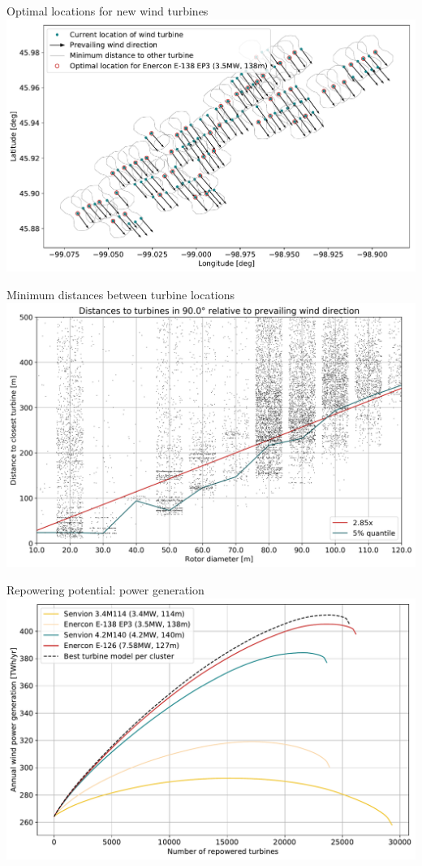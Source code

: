 \documentclass[color=usenames,dvipsnames]{beamer}
\begin{document}
    \begin{frame}{Optimal locations for new wind turbines}
        \includegraphics[width=\textwidth]{../../figures/optimized_cluster-3.pdf}
    \end{frame}

    \begin{frame}{Minimum distances between turbine locations}
        \includegraphics[width=\textwidth]{../../figures/distances_between_turbines.png}
    \end{frame}

    \begin{frame}{Repowering potential: power generation}
        \includegraphics[width=\textwidth]{../../figures/repower_potential-direction-dependent_power_generation.pdf}
    \end{frame}
\end{document}
